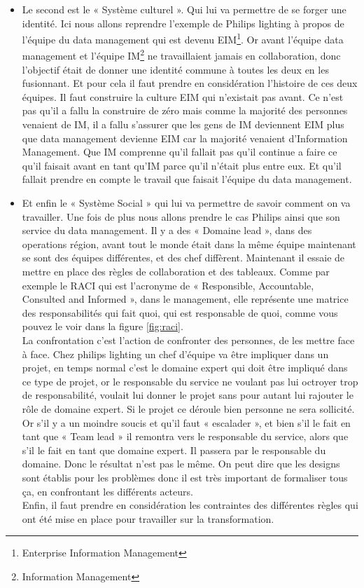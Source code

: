 \documentclass[12pt,a4paper]{article}
\begin{document}
\begin{itemize}
\item Le second est le « Système culturel ». Qui lui va permettre de se forger une identité. Ici nous allons reprendre l'exemple de Philips lighting à propos de l'équipe du data management qui est devenu EIM\footnote{Enterprise Information Management}. Or avant l'équipe data management et l'équipe IM\footnote{Information Management} ne travaillaient jamais en collaboration, donc l'objectif était de donner une identité commune à toutes les deux en les fusionnant. Et pour cela il faut prendre en considération l'histoire de ces deux équipes. Il faut construire la culture EIM qui n'existait pas avant. Ce n'est pas qu'il a fallu la construire de zéro mais comme la majorité des personnes venaient de IM, il a fallu s'assurer que les gens de IM deviennent EIM plus que data management devienne EIM car la majorité venaient d'Information Management. Que IM comprenne qu'il fallait pas qu'il continue a faire ce qu'il faisait avant en tant qu'IM parce qu'il n'était plus entre eux. Et qu'il fallait prendre en compte le travail que faisait l'équipe du data management. \\

\item Et enfin le « Système Social » qui lui va permettre de savoir comment on va travailler. Une fois de plus nous allons prendre le cas Philips ainsi que son service du data management. Il y a des « Domaine lead », dans des operations région, avant tout le monde était dans la même équipe maintenant se sont des équipes différentes, et des chef diffèrent. Maintenant il essaie de mettre en place des règles de collaboration et des tableaux. Comme par exemple le RACI qui est l'acronyme de « Responsible, Accountable, Consulted and Informed », dans le management, elle représente une matrice des responsabilités qui fait quoi, qui est responsable de quoi, comme vous pouvez le voir dans la figure \ref{fig:raci}.\\

La confrontation c'est l'action de confronter des personnes, de les mettre face à face. Chez philips lighting un chef d'équipe va être impliquer dans un projet, en temps normal c'est le domaine expert qui doit être impliqué dans ce type de projet, or le responsable du service ne voulant pas lui octroyer trop de responsabilité, voulait lui donner le projet sans pour autant lui rajouter le rôle de domaine expert. Si le projet ce déroule bien personne ne sera sollicité. Or s'il y a un moindre soucis et qu'il faut « escalader », et bien s'il le fait en tant que « Team lead » il remontra vers le responsable du service, alors que s'il le fait en tant que domaine expert. Il passera par le responsable du domaine. Donc le résultat n'est pas le même. On peut dire que les designs sont établis pour les problèmes donc il est très important de formaliser tous ça, en confrontant les différents acteurs.\\
Enfin, il faut prendre en considération les contraintes des différentes règles qui ont été mise en place pour travailler sur la transformation. \\
\end{itemize}
\end{document}
